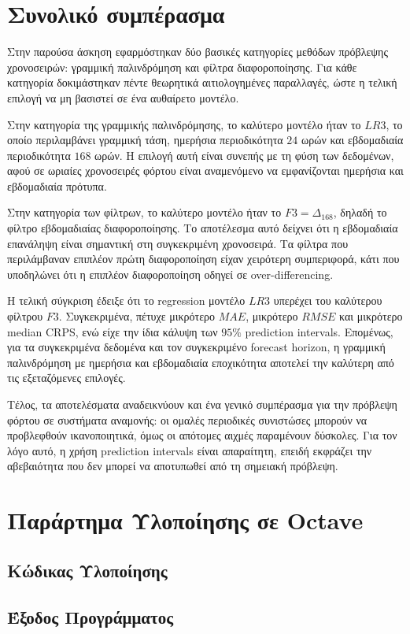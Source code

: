 \documentclass{article}
\begin{document}
\section{Συνολικό συμπέρασμα}

Στην παρούσα άσκηση εφαρμόστηκαν δύο βασικές κατηγορίες μεθόδων πρόβλεψης χρονοσειρών: γραμμική παλινδρόμηση και φίλτρα διαφοροποίησης. Για κάθε κατηγορία δοκιμάστηκαν πέντε θεωρητικά αιτιολογημένες παραλλαγές, ώστε η τελική επιλογή να μη βασιστεί σε ένα αυθαίρετο μοντέλο.

Στην κατηγορία της γραμμικής παλινδρόμησης, το καλύτερο μοντέλο ήταν το $LR3$, το οποίο περιλαμβάνει γραμμική τάση, ημερήσια περιοδικότητα $24$ ωρών και εβδομαδιαία περιοδικότητα $168$ ωρών. Η επιλογή αυτή είναι συνεπής με τη φύση των δεδομένων, αφού σε ωριαίες χρονοσειρές φόρτου είναι αναμενόμενο να εμφανίζονται ημερήσια και εβδομαδιαία πρότυπα.

Στην κατηγορία των φίλτρων, το καλύτερο μοντέλο ήταν το $F3=\Delta_{168}$, δηλαδή το φίλτρο εβδομαδιαίας διαφοροποίησης. Το αποτέλεσμα αυτό δείχνει ότι η εβδομαδιαία επανάληψη είναι σημαντική στη συγκεκριμένη χρονοσειρά. Τα φίλτρα που περιλάμβαναν επιπλέον πρώτη διαφοροποίηση είχαν χειρότερη συμπεριφορά, κάτι που υποδηλώνει ότι η επιπλέον διαφοροποίηση οδηγεί σε over-differencing.

Η τελική σύγκριση έδειξε ότι το regression μοντέλο $LR3$ υπερέχει του καλύτερου φίλτρου $F3$. Συγκεκριμένα, πέτυχε μικρότερο $MAE$, μικρότερο $RMSE$ και μικρότερο median CRPS, ενώ είχε την ίδια κάλυψη των $95\%$ prediction intervals. Επομένως, για τα συγκεκριμένα δεδομένα και τον συγκεκριμένο forecast horizon, η γραμμική παλινδρόμηση με ημερήσια και εβδομαδιαία εποχικότητα αποτελεί την καλύτερη από τις εξεταζόμενες επιλογές.

Τέλος, τα αποτελέσματα αναδεικνύουν και ένα γενικό συμπέρασμα για την πρόβλεψη φόρτου σε συστήματα αναμονής: οι ομαλές περιοδικές συνιστώσες μπορούν να προβλεφθούν ικανοποιητικά, όμως οι απότομες αιχμές παραμένουν δύσκολες. Για τον λόγο αυτό, η χρήση prediction intervals είναι απαραίτητη, επειδή εκφράζει την αβεβαιότητα που δεν μπορεί να αποτυπωθεί από τη σημειακή πρόβλεψη.

\newpage
\section{Παράρτημα Υλοποίησης σε Octave}

\subsection{Κώδικας Υλοποίησης}


\subsection{Έξοδος Προγράμματος}

\end{document}
